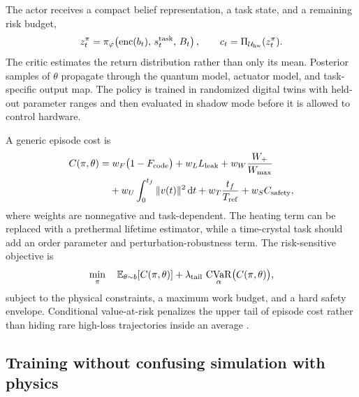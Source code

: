 \documentclass[10pt,twoside]{article}
\DeclareMathOperator{\CVaR}{CVaR}
\newcommand{\Fcode}{F_{\rm code}}
\newcommand{\E}{\mathbb E}
\newcommand{\dd}{\,\mathrm d}
\begin{document}
The actor receives a compact belief representation, a task state, and a remaining risk budget,
\begin{equation}
z_t^{\pi}=\pi_\varphi\!\left(\operatorname{enc}(b_t),\,s_t^{\rm task},\,B_t\right),
\qquad c_t=\Pi_{\mathcal U_{\rm hw}}(z_t^{\pi}).
\end{equation}
The critic estimates the return distribution rather than only its mean. Posterior samples of $\theta$ propagate through the quantum model, actuator model, and task-specific output map. The policy is trained in randomized digital twins with held-out parameter ranges and then evaluated in shadow mode before it is allowed to control hardware.

A generic episode cost is
\begin{align}
C(\pi,\theta)=&\;w_F\bigl(1-\Fcode\bigr)+w_L L_{\rm leak}
+w_W\frac{W_+}{W_{\max}}\\
&+w_U\int_0^{t_f}\|v(t)\|^2\dd t
+w_T\frac{t_f}{T_{\rm ref}}
+w_S C_{\rm safety},
\label{eq:cost}
\end{align}
where weights are nonnegative and task-dependent. The heating term can be replaced with a prethermal lifetime estimator, while a time-crystal task should add an order parameter and perturbation-robustness term. The risk-sensitive objective is
\begin{equation}
\min_{\pi}\quad \E_{\theta\sim b}[C(\pi,\theta)]
+\lambda_{\rm tail}\,\CVaR_{\alpha}\bigl(C(\pi,\theta)\bigr),
\label{eq:riskobjective}
\end{equation}
subject to the physical constraints, a maximum work budget, and a hard safety envelope. Conditional value-at-risk penalizes the upper tail of episode cost rather than hiding rare high-loss trajectories inside an average \citep{rockafellar2000cvar}.

\subsection{Training without confusing simulation with physics}
\end{document}

